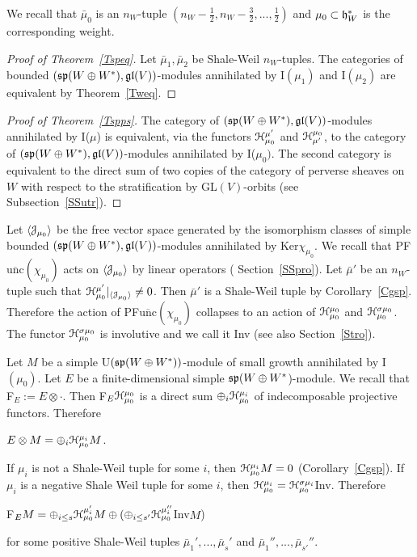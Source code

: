 \documentclass[12pt]{amsart}
\theoremstyle{definition}\newtheorem{theorem}{Theorem}[section]
\theoremstyle{definition}\newtheorem{definition}[proposition]{Definition}
\theoremstyle{remark}\newtheorem{example}[proposition]{Example}
\begin{document}
We recall that $\bar\mu_0$ is an $n_W$-tuple $(n_W-\frac{1}{2}, n_W-\frac{3}{2},..., \frac{1}{2})$ and $\mu_0\subset\frak h_W^*$ is the corresponding weight.
\begin{proof}[Proof of Theorem~\ref{Tspeq}] Let $\bar\mu_1, \bar\mu_2$ be Shale-Weil $n_W$-tuples. The categories of bounded $(\frak{sp}(W\oplus W^*), \frak{gl}(V))$-modules annihilated by I$(\mu_1)$ and I$(\mu_2)$ are equivalent by Theorem~\ref{Tweq}.\end{proof}
\begin{proof}[Proof of Theorem~\ref{Tspps}] The category of $(\frak{sp}(W\oplus W^*), \frak{gl}(V))$-modules annihilated by I($\mu$) is equivalent, via the functors $\EuScript H_{\mu_0}^{\mu'}$ and $\EuScript H_{\mu'}^{\mu_0}$, to the category of $(\frak{sp}(W\oplus W^*), \frak{gl}(V))$-modules annihilated by I($\mu_0)$. The second category is equivalent to the direct sum of two copies of the category of perverse sheaves on $W$ with respect to the stratification by GL$(V)$-orbits (see Subsection~\ref{SSutr}).\end{proof}
Let $\langle\EuScript J_{\mu_0}\rangle$ be the free vector space generated by the isomorphism classes of simple bounded $(\frak{sp}(W\oplus W^*), \frak{gl}(V))$-modules annihilated by Ker$\chi_{\mu_0}$. We recall that PF$\overline{\mathrm{unc}}(\chi_{\mu_0})$ acts on $\langle\EuScript J_{\mu_0}\rangle$ by linear operators ( Section~\ref{SSpro}). Let $\bar\mu'$ be an $n_W$-tuple such that $\EuScript H_{\mu_0}^{\mu'}|_{\langle\EuScript J_{\mu_0}\rangle}\ne 0$. Then $\bar\mu'$ is a Shale-Weil tuple by Corollary~\ref{Cgsp}. Therefore the action of PF$\overline{\mathrm{unc}}(\chi_{\mu_0})$ collapses to an action of $\EuScript H_{\mu_0}^{\mu_0}$ and $\EuScript H_{\mu_0}^{\sigma\mu_0}$. The functor $\EuScript H_{\mu_0}^{\sigma\mu_0}$ is involutive and we call it Inv (see also Section~\ref{Stro}).

Let $M$ be a simple U$(\frak{sp}(W\oplus W^*))$-module of small growth annihilated by I$(\mu_0)$. Let $E$ be a finite-dimensional simple $\frak{sp}(W\oplus W^*$)-module.  We recall that F$_E:=E\otimes\cdot$. Then F$_E\EuScript H_{\mu_0}^{\mu_0}$ is a direct sum $\oplus_i\EuScript H_{\mu_0}^{\mu_i}$ of indecomposable projective functors. Therefore \begin{center}$E\otimes M=\oplus_i\EuScript H_{\mu_0}^{\mu_i}M$.\end{center} If $\mu_i$ is not a Shale-Weil tuple for some $i$, then $\EuScript H_{\mu_0}^{\mu_i}M=0$ (Corollary~\ref{Cgsp}). If $\mu_i$ is a negative Shale Weil tuple for some $i$, then $\EuScript H_{\mu_0}^{\mu_i}=\EuScript H_{\mu_0}^{\sigma\mu_i}$Inv. Therefore \begin{center}F$_EM=\oplus_{i\le s}\EuScript H_{\mu_0}^{\mu_i'}M\oplus(\oplus_{i\le s'}\EuScript H_{\mu_0}^{\mu_i''}$Inv$M$)\end{center} for some positive Shale-Weil tuples $\bar\mu_1',..., \bar\mu_s'$ and $\bar\mu_1'',..., \bar\mu_{s'}''$.
\end{document}

